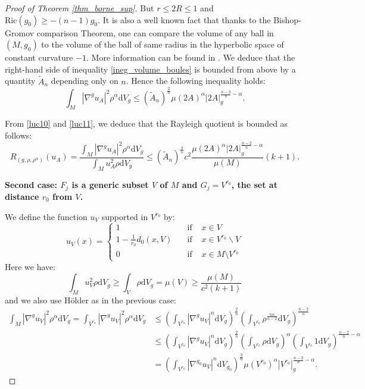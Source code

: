 \documentclass[12pt,reqno]{amsart}		%
\theoremstyle{plain}
\theoremstyle{definition}
\theoremstyle{remark}
\numberwithin{equation}{section}
\renewcommand{\textbf}[1]{\begingroup\bfseries\mathversion{bold}#1\endgroup} %
\renewcommand{\d}{\mathrm{d}}
\begin{document}
\begin{proof}[Proof of Theorem \ref{thm_borne_sup}]
But $r\leqslant 2R \leqslant 1$ and $\text{Ric}(g_{0})\geqslant -(n-1)g_{0}$. It is also a well known fact that thanks to the Bishop-Gromov comparison Theorem, one can compare the volume of any ball in $(M,g_0)$ to the volume of the ball of same radius in the hyperbolic space of constant curvature $-1$.
More information can be found in \cite[Theorem 3.1]{zhu_1997}.
We deduce that the right-hand side of inequality \eqref{ineg_volume_boules} is bounded from above by a quantity $\tilde{A}_n$ depending only on $n$.
Hence the following inequality holds:
	\begin{equation}
	\label{luc11}
	\int_{M}|\nabla^{g} u_{A}|^{2}\rho^{\alpha}\d V_{g}\leqslant \left(\tilde{A}_n\right)^{\frac{2}{n}}\mu(2A)^{\alpha}|2A|_{g}^{\frac{n-2}{n}-\alpha}.
	\end{equation}
	
	From \eqref{luc10} and \eqref{luc11}, we deduce that the Rayleigh quotient is bounded as follows:
	\begin{equation}
	\label{luc7}
	R_{(g,\rho,\rho^{\alpha})}(u_{A})=\frac{\int_{M}|\nabla^{g} u_{A}|^{2}\rho^{\alpha}\d V_{g}}{\int_{M}u_{A}^{2}\rho \d V_{g}}\leqslant \left(\tilde{A}_n\right)^{\frac{2}{n}}c^2\frac{\mu(2A)^{\alpha}|2A|_{g}^{\frac{n-2}{n}-\alpha}}{\mu(M)}(k+1).
	\end{equation}
	
	
	\medskip
	\textbf{Second case:} $F_{j}$ is a generic subset $V$ of $M$ and $G_{j}= V^{r_{0}}$, the set at distance $r_0$ from $V$.
	\begin{center}
		\def\svgscale{0.25}
		
	\end{center}
	We define the function $u_{V}$ supported in $V^{r_{0}}$ by:
	\[
	u_{V}(x) = \left\{
	\begin{array}{lll}
	1\quad						&\mbox{if }& x\in V \\
	1-\frac{1}{r_{0}}d_0(x,V)\quad&\mbox{if }& x\in V^{r_{0}}\backslash V \\
	0							&\mbox{if }& x\in M\setminus V^{r_{0}}
	\end{array}
	\right.
	\]
Here we have:
	\[
	\int_{M}u_{V}^{2}\rho \d V_{g}\geqslant \int_{V}\rho \d V_{g}
	=\mu(V)\geqslant\frac{\mu(M)}{c^{2}(k+1)}
	\]
	and we also use Hölder as in the previous case:
\begin{align*}
\int_{M}|\nabla^{g}u_{V}|^{2}\rho^{\alpha}\d V_{g}
=\int_{V^{r_{0}}}|\nabla^{g}u_{V}|^{2}\rho^{\alpha}\d V_{g}
	&\leqslant \left(\int_{V^{r_{0}}}|\nabla^{g} u_{V}|^{n}\d V_{g}\right)^{\frac{2}{n}}
\left(\int_{V^{r_{0}}}\rho^{\frac{n\alpha}{n-2}}\d V_{g}\right)^{\frac{n-2}{n}}  \\
	&\leqslant \left(\int_{V^{r_{0}}}|\nabla^{g} u_{V}|^{n}\d V_{g}\right)^{\frac{2}{n}}\left(\int_{V^{r_{0}}}\rho \d V_{g}\right)^{\alpha}\left(\int_{V^{r_{0}}}1\d V_{g}\right)^{\frac{n-2}{n}-\alpha}  \\
			&= \left(\int_{V^{r_{0}}}|\nabla^{g_{0}} u_{V}|^{n}\d V_{g_{0}}\right)^{\frac{2}{n}} \mu(V^{r_{0}})^{\alpha}|V^{r_{0}}|_{g}^{\frac{n-2}{n}-\alpha}.
\end{align*}


\end{proof}
\end{document}
